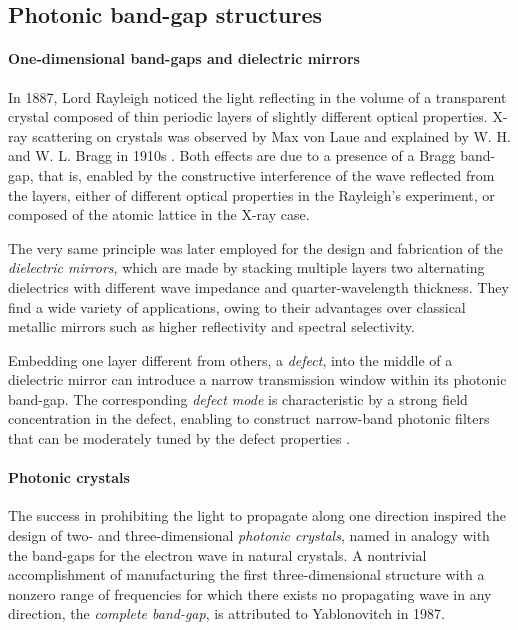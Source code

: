 
\subsection{Photonic band-gap structures} 
\paragraph{One-dimensional band-gaps and dielectric mirrors}%
In 1887, Lord Rayleigh \cite{johnson2003introduction} noticed the light reflecting in the volume of a transparent crystal composed of thin periodic layers of slightly different optical properties. X-ray scattering on crystals was observed by Max von Laue \cite{friedrich1913interferenzerscheinungen} and explained by W. H. and W. L. Bragg in 1910s \cite{bragg1913reflection}. 
Both effects are due to a presence of a Bragg band-gap, that is, enabled by the constructive interference of the wave reflected from the layers, either of different optical properties in the Rayleigh's experiment, or composed of the atomic lattice in the X-ray case. 

The very same principle was later %
employed for the design and fabrication of the \textit{dielectric mirrors}, which are made by stacking multiple layers two alternating dielectrics with different wave impedance and quarter-wavelength thickness. They find a wide variety of applications, owing to their advantages over classical metallic mirrors such as higher reflectivity and spectral selectivity.  %

Embedding one layer different from others, a \textit{defect}, into the middle of a dielectric mirror can introduce a narrow transmission window within its photonic band-gap. The corresponding \textit{defect mode} is characteristic by a strong field concentration in the defect, enabling to construct narrow-band photonic filters that can be moderately tuned by the defect properties \cite{nemec2005highly}.

\paragraph{Photonic crystals}%
The success in prohibiting the light to propagate along one direction inspired the design of two- and three-dimensional \textit{photonic crystals}, named in analogy with the band-gaps for the electron wave in natural crystals. A nontrivial accomplishment of manufacturing the first three-dimensional structure with a nonzero range of frequencies for which there exists no propagating wave in any direction, the \textit{complete band-gap}, is attributed to Yablonovitch \cite{yablonovitch1987} in 1987.

